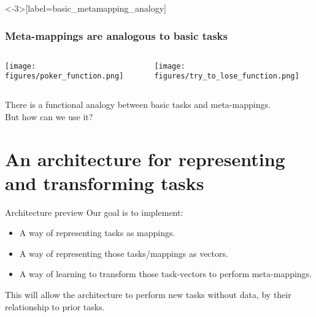 \documentclass{beamer}
\begin{document}
\begin{frame}<-3>[label=basic_metamapping_analogy]
\frametitle{Meta-mappings are analogous to basic tasks}
\begin{columns}
\begin{column}{0.5\textwidth}
\vspace{2em}
\texttt{[image: figures/poker\_function.png]}
\end{column}
\begin{column}{0.5\textwidth}
\vspace{2em}
\texttt{[image: figures/try\_to\_lose\_function.png]}
\end{column}
\end{columns}
\end{frame}

\begin{frame}[standout]
There is a functional analogy between basic tasks and meta-mappings. \\[1em]
But how can we use it?
\end{frame}

\section{An architecture for representing and transforming tasks}

\begin{frame}{Architecture preview}
Our goal is to implement:
\begin{itemize}
\item A way of representing tasks as mappings.
\item A way of representing those tasks/mappings as vectors.
\item A way of learning to transform those task-vectors to perform meta-mappings.
\end{itemize}
This will allow the architecture to perform new tasks without data, by their relationship to prior tasks.
\end{frame}
\end{document}
